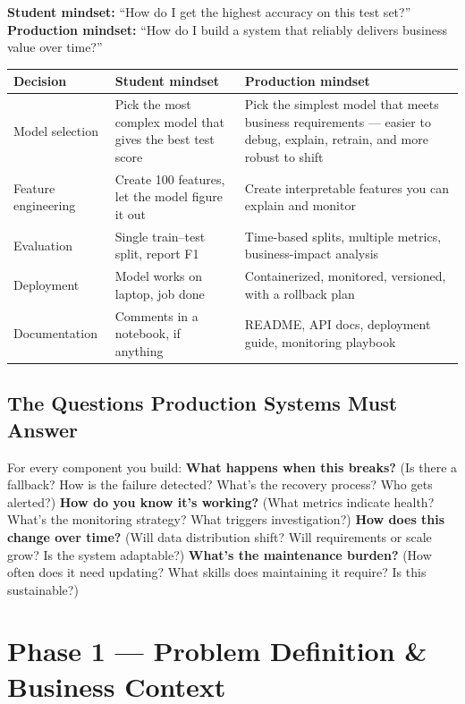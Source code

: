 \begin{keytakeaway}
\textbf{Student mindset:} ``How do I get the highest accuracy on this test set?'' \\
\textbf{Production mindset:} ``How do I build a system that reliably delivers business value over time?''
\end{keytakeaway}

\begin{longtable}{p{} p{} p{}}
\toprule
\textbf{Decision} & \textbf{Student mindset} & \textbf{Production mindset} \\
\midrule
\endhead
Model selection & Pick the most complex model that gives the best test score & Pick the simplest model that meets
business requirements --- easier to debug, explain, retrain, and more robust to shift \\
Feature engineering & Create 100 features, let the model figure it out & Create interpretable features you can
explain and monitor \\
Evaluation & Single train--test split, report F1 & Time-based splits, multiple metrics, business-impact analysis
\\
Deployment & Model works on laptop, job done & Containerized, monitored, versioned, with a rollback plan \\
Documentation & Comments in a notebook, if anything & README, API docs, deployment guide, monitoring playbook \\
\bottomrule
\end{longtable}

\subsection{The Questions Production Systems Must Answer}

For every component you build: \textbf{What happens when this breaks?} (Is there a fallback? How is the failure
detected? What's the recovery process? Who gets alerted?) \textbf{How do you know it's working?} (What metrics
indicate health? What's the monitoring strategy? What triggers investigation?) \textbf{How does this change over
time?} (Will data distribution shift? Will requirements or scale grow? Is the system adaptable?) \textbf{What's
the maintenance burden?} (How often does it need updating? What skills does maintaining it require? Is this
sustainable?)

\section{Phase 1 --- Problem Definition \& Business Context}

